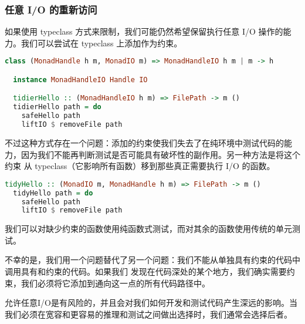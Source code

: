 \documentclass[./main.tex]{subfiles}
\begin{document}
\subsubsection*{任意 I/O 的重新访问}

如果使用 typeclass 方式来限制，我们可能仍然希望保留执行任意 I/O 操作的能力。我们可以尝试在 typeclass 上添加作为约束。

\begin{lstlisting}[language=Haskell]
  class (MonadHandle h m, MonadIO m) => MonadHandleIO h m | m -> h

  instance MonadHandleIO Handle IO

  tidierHello :: (MonadHandleIO h m) => FilePath -> m ()
  tidierHello path = do
    safeHello path
    liftIO $ removeFile path
\end{lstlisting}

不过这种方式存在一个问题：添加的约束使我们失去了在纯环境中测试代码的能力，因为我们不能再判断测试是否可能具有破坏性的副作用。另一种方法是将这个约束
从 typeclass（它影响所有函数）移到那些真正需要执行 I/O 的函数。

\begin{lstlisting}[language=Haskell]
  tidyHello :: (MonadIO m, MonadHandle h m) => FilePath -> m ()
  tidyHello path = do
    safeHello path
    liftIO $ removeFile path
\end{lstlisting}

我们可以对缺少约束的函数使用纯函数式测试，而对其余的函数使用传统的单元测试。

不幸的是，我们用一个问题替代了另一个问题：我们不能从单独具有约束的代码中调用具有和约束的代码。如果我们
发现在代码深处的某个地方，我们确实需要约束，我们必须将它添加到通向这一点的所有代码路径中。

允许任意I/O是有风险的，并且会对我们如何开发和测试代码产生深远的影响。当我们必须在宽容和更容易的推理和测试之间做出选择时，我们通常会选择后者。
\end{document}
